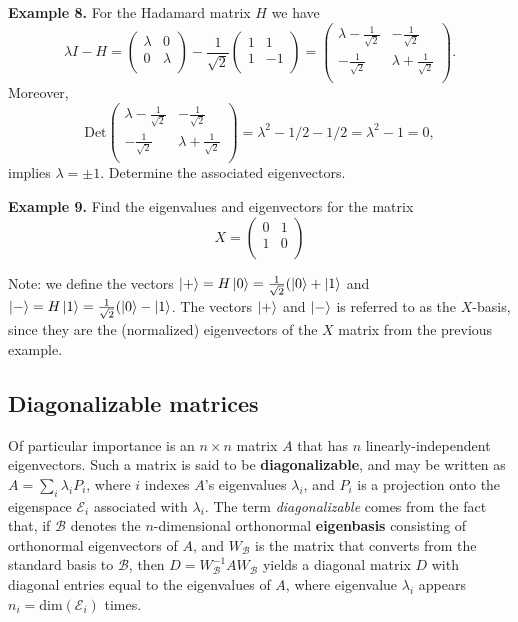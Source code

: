 \documentclass [12pt]{article}
\theoremstyle{definition}
\begin{document}
\textbf{Example 8.}  For the Hadamard matrix $H$ we have 
\[\lambda I - H = 
\left(\begin{array}{cc}
\lambda & 0\\
0 & \lambda \\
\end{array}\right)
-
\frac{1}{\sqrt{2}}\left(\begin{array}{cc}
1 & 1\\
1 & -1 \\
\end{array}\right)  =
\left(\begin{array}{cc}
\lambda - \frac{1}{\sqrt{2}} & -\frac{1}{\sqrt{2}}\\
-\frac{1}{\sqrt{2}} & \lambda + \frac{1}{\sqrt{2}} \\
\end{array}\right).
\]
Moreover,
\[\mbox{Det}
\left(\begin{array}{cc}
\lambda - \frac{1}{\sqrt{2}} & -\frac{1}{\sqrt{2}}\\
-\frac{1}{\sqrt{2}} & \lambda + \frac{1}{\sqrt{2}} \\

\end{array}\right)
= \lambda^2-1/2 - 1/2 = \lambda^2 - 1 = 0,\]
implies $\lambda = \pm 1$.
Determine the associated eigenvectors.




\newpage
\textbf{Example 9.}  Find the eigenvalues and eigenvectors for the matrix 
\[X=
\left(\begin{array}{cc}
0 & 1\\
1 &  0 \\
\end{array}\right)
\]

\vspace{3.0in}
Note: we define the vectors $\ket{+} = H\ket{0} = \frac{1}{\sqrt{2}}(\ket{0}+\ket{1}$ and $\ket{-} = H\ket{1} = \frac{1}{\sqrt{2}}(\ket{0}-\ket{1}$.
The vectors $\ket{+}$ and $\ket{-}$ is referred to as the $X$-basis, since they are the (normalized) eigenvectors of the $X$ matrix from the previous example.

\newpage
\subsection*{Diagonalizable matrices}

Of particular importance is an $n\times n$ matrix $A$ that has $n$ linearly-independent eigenvectors. Such a matrix is said to be \textbf{diagonalizable}, and may be written
as $A=\underset{i}{\sum}\lambda_iP_i$, where $i$ indexes $A$'s eigenvalues $\lambda_i$, and $P_i$ is a projection onto the eigenspace $\mathcal{E}_i$ associated with $\lambda_i$. 
The term \textit{diagonalizable} comes from the fact that, if $\mathcal{B}$ denotes the $n$-dimensional orthonormal \textbf{eigenbasis} consisting of orthonormal
 eigenvectors of $A$, and $W_{\mathcal{B}}$ is the matrix
that converts from the standard basis to $\mathcal{B}$, then $D=W_{\mathcal{B}}^{-1}AW_{\mathcal{B}}$ yields a diagonal matrix $D$ with diagonal entries equal to the eigenvalues
of $A$, where eigenvalue $\lambda_i$ appears $n_i=\mbox{dim}(\mathcal{E}_i)$ times.
\end{document}
